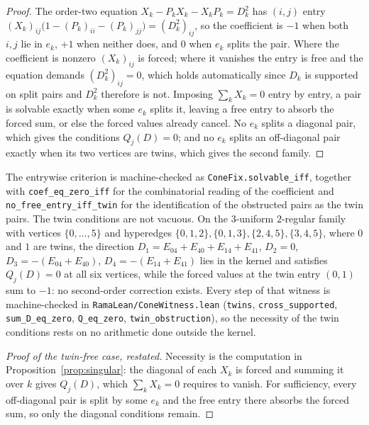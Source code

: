 \documentclass[11pt]{article}
\theoremstyle{remark}
\begin{document}
\begin{proof}
The order-two equation $X_k-P_kX_k-X_kP_k=D_k^2$ has $(i,j)$ entry
$(X_k)_{ij}\bigl(1-(P_k)_{ii}-(P_k)_{jj}\bigr)=(D_k^2)_{ij}$, so the coefficient is $-1$ when both
$i,j$ lie in $e_k$, $+1$ when neither does, and $0$ when $e_k$ splits the pair. Where the coefficient
is nonzero $(X_k)_{ij}$ is forced; where it vanishes the entry is free and the equation demands
$(D_k^2)_{ij}=0$, which holds automatically since $D_k$ is supported on split pairs and $D_k^2$
therefore is not. Imposing $\sum_kX_k=0$ entry by entry, a pair is solvable exactly when some $e_k$
splits it, leaving a free entry to absorb the forced sum, or else the forced values already cancel.
No $e_k$ splits a diagonal pair, which gives the conditions $Q_j(D)=0$; and no $e_k$ splits an
off-diagonal pair exactly when its two vertices are twins, which gives the second family.
\end{proof}

The entrywise criterion is machine-checked as \texttt{ConeFix.solvable\_iff}, together with
\texttt{coef\_eq\_zero\_iff} for the combinatorial reading of the coefficient and
\texttt{no\_free\_entry\_iff\_twin} for the identification of the obstructed pairs as the twin
pairs. The twin conditions are not vacuous. On the $3$-uniform $2$-regular family with vertices
$\{0,\dots,5\}$ and hyperedges $\{0,1,2\},\{0,1,3\},\{2,4,5\},\{3,4,5\}$, where $0$ and $1$ are
twins, the direction $D_1=E_{04}+E_{40}+E_{14}+E_{41}$, $D_2=0$, $D_3=-(E_{04}+E_{40})$,
$D_4=-(E_{14}+E_{41})$ lies in the kernel and satisfies $Q_j(D)=0$ at all six vertices, while the
forced values at the twin entry $(0,1)$ sum to $-1$: no second-order correction exists. Every step of
that witness is machine-checked in \texttt{RamaLean/ConeWitness.lean}
(\texttt{twins}, \texttt{cross\_supported}, \texttt{sum\_D\_eq\_zero}, \texttt{Q\_eq\_zero},
\texttt{twin\_obstruction}), so the necessity of the twin conditions rests on no arithmetic done
outside the kernel.

\begin{proof}[Proof of the twin-free case, restated]
Necessity is the computation in Proposition~\ref{prop:singular}: the diagonal of each $X_k$ is
forced and summing it over $k$ gives $Q_j(D)$, which $\sum_kX_k=0$ requires to vanish. For
sufficiency, every off-diagonal pair is split by some $e_k$ and the free entry there absorbs the
forced sum, so only the diagonal conditions remain.
\end{proof}
\end{document}
